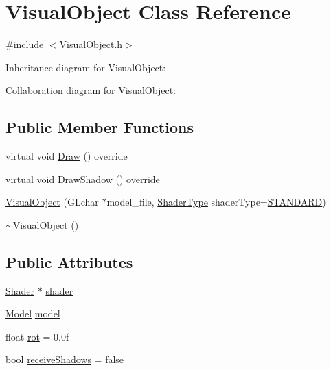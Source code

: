 \hypertarget{class_visual_object}{}\section{Visual\+Object Class Reference}
\label{class_visual_object}


{\ttfamily \#include $<$Visual\+Object.\+h$>$}



Inheritance diagram for Visual\+Object\+:


Collaboration diagram for Visual\+Object\+:
\subsection*{Public Member Functions}
\begin{DoxyCompactItemize}
\item 
virtual void \mbox{\hyperlink{class_visual_object_a10c0e01e375fd4af08e57f3475dd312c}{Draw}} () override
\item 
virtual void \mbox{\hyperlink{class_visual_object_a88e778dc97ad93cefd5193d6899d6c82}{Draw\+Shadow}} () override
\item 
\mbox{\hyperlink{class_visual_object_acae4022cf0fa793dfba4ea5a91b9d242}{Visual\+Object}} (G\+Lchar $\ast$model\+\_\+file, \mbox{\hyperlink{_game_object_8h_a6230e1b9ecbf2d82d10856fd7e1fde46}{Shader\+Type}} shader\+Type=\mbox{\hyperlink{_texture_8h_a65468556d79304b3a4bfc464cc12e549a94e94133f4bdc1794c6b647b8ea134d0}{S\+T\+A\+N\+D\+A\+RD}})
\item 
\mbox{\hyperlink{class_visual_object_a068ba11545322d81d9ad8c675c4233f9}{$\sim$\+Visual\+Object}} ()
\end{DoxyCompactItemize}
\subsection*{Public Attributes}
\begin{DoxyCompactItemize}
\item 
\mbox{\hyperlink{class_shader}{Shader}} $\ast$ \mbox{\hyperlink{class_visual_object_a6d00e06796983b19f57d6fd86b202902}{shader}}
\item 
\mbox{\hyperlink{class_model}{Model}} \mbox{\hyperlink{class_visual_object_a325fec77ff1a5441f1ff4ffa98e508c8}{model}}
\item 
float \mbox{\hyperlink{class_visual_object_ae07ac7780e0fca78a7c61c364fa1bf05}{rot}} = 0.\+0f
\item 
bool \mbox{\hyperlink{class_visual_object_af54b3c823b3ca24736faeedc88ef90f3}{receive\+Shadows}} = false
\end{DoxyCompactItemize}


